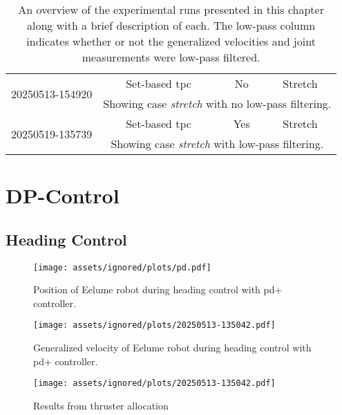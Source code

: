 \begin{table}[!ht]
\begin{tabular}{|c|c|c|c|}
        \hline
        \multirow{2}{*}{20250513-154920} & Set-based \gls{tpc} & No & Stretch \\ \cline{2-4}
        & \multicolumn{3}{p{0.75\linewidth}|}{Showing case \textit{stretch} with no low-pass filtering.} \\ \hline
        \multirow{2}{*}{20250519-135739} & Set-based \gls{tpc} & Yes & Stretch \\ \cline{2-4}
        & \multicolumn{3}{p{0.75\linewidth}|}{Showing case \textit{stretch} with low-pass filtering.} \\ \hline
    \end{tabular}
    \caption[An overview of the experimental runs]{An overview of the experimental
    runs presented in this chapter along with a brief description of each.
    The low-pass column indicates whether or not the generalized velocities and joint measurements were low-pass filtered.}
    \label{tab:eelume:experimental-runs}
\end{table}

\section{DP-Control}

\subsection{Heading Control}

\begin{figure}[!ht]
    \centering
    \texttt{[image: assets/ignored/plots/pd.pdf]}
    \label{fig:results:dp_heading:pos}
    \caption{Position of Eelume robot during heading control with \gls{pd+} controller.}
\end{figure}
\begin{figure}[!ht]
    \centering
    \texttt{[image: assets/ignored/plots/20250513-135042.pdf]}
    \label{fig:results:dp_heading:vel}
    \caption{Generalized velocity of Eelume robot during heading control with \gls{pd+} controller.}
\end{figure}
\begin{figure}[!ht]
    \centering
    \texttt{[image: assets/ignored/plots/20250513-135042.pdf]}
    \label{fig:results:dp_heading:forces2}
    \caption{Results from thruster allocation}
\end{figure}

